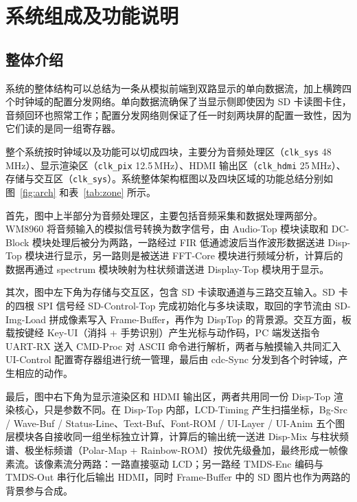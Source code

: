 \documentclass[withoutpreface,bwprint]{cumcmthesis}
\begin{document}
\newpage
\section{系统组成及功能说明}

\subsection{整体介绍}

系统的整体结构可以总结为一条从模拟前端到双路显示的单向数据流，加上横跨四个时钟域的配置分发网络。单向数据流确保了当显示侧即使因为 SD 卡读图卡住，音频回环也照常工作；配置分发网络则保证了任一时刻两块屏的配置一致性，因为它们读的是同一组寄存器。

整个系统按时钟域以及功能可以切成四块，主要分为音频处理区（\texttt{clk\_sys} 48\,MHz）、显示渲染区（\texttt{clk\_pix} 12.5\,MHz）、HDMI 输出区（\texttt{clk\_hdmi} 25\,MHz）、存储与交互区（\texttt{clk\_sys}）。系统整体架构框图以及四块区域的功能总结分别如图~\ref{fig:arch} 和表~\ref{tab:zone} 所示。

首先，图中上半部分为音频处理区，主要包括音频采集和数据处理两部分。WM8960 将音频输入的模拟信号转换为数字信号，由 Audio-Top 模块读取和 DC-Block 模块处理后被分为两路，一路经过 FIR 低通滤波后当作波形数据送进 Disp-Top 模块进行显示，另一路则是被送进 FFT-Core 模块进行频域分析，计算后的数据再通过 spectrum 模块映射为柱状频谱送进 Display-Top 模块用于显示。

其次，图中左下角为存储与交互区，包含 SD 卡读取通道与三路交互输入。SD 卡的四根 SPI 信号经 SD-Control-Top 完成初始化与多块读取，取回的字节流由 SD-Img-Load 拼成像素写入 Frame-Buffer，再作为 DispTop 的背景源。交互方面，板载按键经 Key-UI（消抖 + 手势识别）产生光标与动作码，PC 端发送指令 UART-RX 送入 CMD-Proc 对 ASCII 命令进行解析，两者与触摸输入共同汇入 UI-Control 配置寄存器组进行统一管理，最后由 cdc-Sync 分发到各个时钟域，产生相应的动作。

最后，图中右下角为显示渲染区和 HDMI 输出区，两者共用同一份 Disp-Top 渲染核心，只是参数不同。在 Disp-Top 内部，LCD-Timing 产生扫描坐标，Bg-Src / Wave-Buf / Status-Line、Text-Buf、Font-ROM / UI-Layer / UI-Anim 五个图层模块各自接收同一组坐标独立计算，计算后的输出统一送进 Disp-Mix 与柱状频谱、极坐标频谱（Polar-Map + Rainbow-ROM）按优先级叠加，最终形成一帧像素流。该像素流分两路：一路直接驱动 LCD；另一路经 TMDS-Enc 编码与 TMDS-Out 串行化后输出 HDMI，同时 Frame-Buffer 中的 SD 图片也作为两路的背景参与合成。
\end{document}
